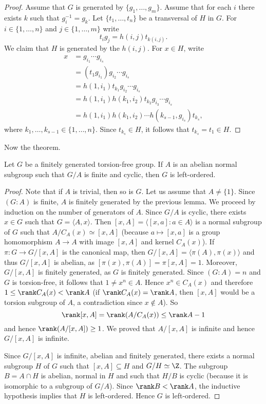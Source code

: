\begin{proof}
	Assume that $G$ is generated by $\{g_1,\dots,g_m\}$. Assume that
	for each $i$ there exists $k$ such that $g_i^{-1}=g_k$. Let $\{t_1,\dots,t_n\}$ be
	a transversal of $H$ in $G$. For $i\in\{1,\dots,n\}$ and 
	$j\in\{1,\dots,m\}$ write 
	\[
		t_ig_j=h(i,j)t_{k(i,j)}.
	\]
	We claim that $H$ is generated by the $h(i,j)$. For $x\in H$, write 
	\begin{align*}
	x &=g_{i_1}\cdots g_{i_s}\\
	&= (t_1g_{i_1})g_{i_2}\cdots g_{i_s}\\
	&= h(1,i_1)t_{k_1}g_{i_2}\cdots g_{i_s}\\
	&= h(1,i_1)h(k_1,i_2)t_{k_2}g_{i_3}\cdots g_{i_s}\\
	&= h(1,i_1)h(k_1,i_2)\cdots h(k_{s-1},g_{i_s})t_{k_s},
	\end{align*}
	where $k_1,\dots,k_{s-1}\in\{1,\dots,n\}$. Since $t_{k_s}\in H$, it follows that 
	$t_{k_s}=t_1\in H$.
\end{proof}

Now the theorem.

\begin{theorem}
	Let $G$ be a finitely generated torsion-free group. If $A$ is an abelian normal
	subgroup such that $G/A$ is finite and cyclic, then $G$ is left-ordered. 
\end{theorem}

\begin{proof}
	Note that if $A$ is trivial, then so is $G$. Let us assume that $A\ne\{1\}$. 
    Since $(G:A)$ is finite, $A$ is finitely generated by the previous lemma. 
    We proceed by induction on the number of generators of $A$. Since 
    $G/A$ is cyclic, there exists $x\in G$ such that $G=\langle A,x\rangle$. Then
    $[x,A]=\langle [x,a]:a\in A\rangle$ is a normal subgroup of $G$ such that 
    $A/C_A(x)\simeq [x,A]$ (because $a\mapsto [x,a]$ is a group homomorphism $A\to A$
    with image $[x,A]$ and kernel $C_A(x)$). If $\pi\colon G\to G/[x,A]$ is the canonical map, then
    $G/[x,A]=\langle \pi(A),\pi(x)\rangle$ and thus $G/[x,A]$ is abelian, as 
    $[\pi(x),\pi(A)]=\pi[x,A]=1$. Moreover, $G/[x,A]$ is finitely generated, as $G$
    is finitely generated. Since $(G:A)=n$ and $G$ is torsion-free, it follows that 
    $1\ne x^n\in A$. Hence $x^n\in C_A(x)$ and therefore $1\leq \rank C_A(x)<\rank A$ (if $\rank
    C_A(x)=\rank A$, then $[x,A]$ would be a torsion subgroup of $A$, a contradiction
    since $x\not\in A$). So 
    \[
    \rank[x,A]=\rank (A/C_A(x))\leq\rank A-1
    \]
    and hence $\rank (A/[x,A])\geq 1$. We proved that $A/[x,A]$ is infinite and hence 
    $G/[x,A]$ is infinite. 

    Since $G/[x,A]$ is infinite, abelian and finitely generated, there exists a normal subgroup
    $H$ of $G$ such that $[x,A]\subseteq H$ and $G/H\simeq\Z$. The subgroup 
    $B=A\cap H$ is abelian, normal in $H$ and such that $H/B$ is cyclic
    (because it is isomorphic to a subgroup of $G/A$). Since $\rank B<\rank A$, the inductive hypothesis implies that $H$ is left-ordered. Hence $G$ is left-ordered. 
\end{proof}

